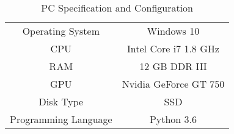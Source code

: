 \begin{table}[t!]
	\centering
	\caption{PC Specification and Configuration}
	\label{table:pc}
	\begin{tabular} {c c}
		\toprule
		Operating System & Windows 10\\
		CPU & Intel Core i7 1.8 GHz\\
		RAM & 12 GB DDR III\\
		GPU & Nvidia GeForce GT 750\\
		Disk Type & SSD\\
		Programming Language & Python 3.6 \\
		\bottomrule %
	\end{tabular}
\end{table}



